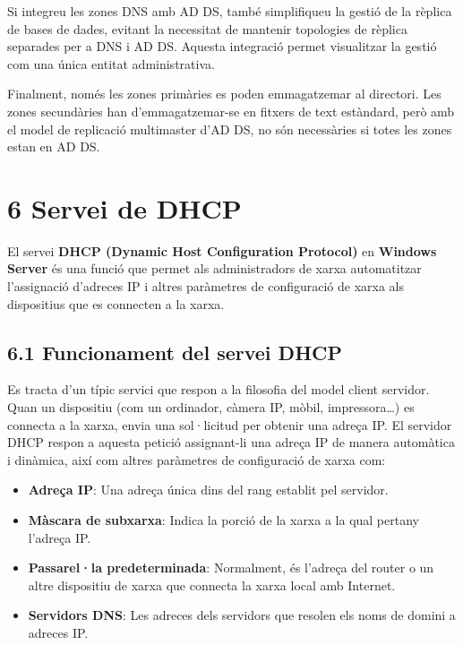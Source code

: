 \documentclass[
  a4paper,
]{article}
\providecommand{\tightlist}{%
  \setlength{\itemsep}{0pt}\setlength{\parskip}{0pt}}
\begin{document}
Si integreu les zones DNS amb AD DS, també simplifiqueu la gestió de la
rèplica de bases de dades, evitant la necessitat de mantenir topologies
de rèplica separades per a DNS i AD DS. Aquesta integració permet
visualitzar la gestió com una única entitat administrativa.

Finalment, només les zones primàries es poden emmagatzemar al directori.
Les zones secundàries han d'emmagatzemar-se en fitxers de text
estàndard, però amb el model de replicació multimaster d'AD DS, no són
necessàries si totes les zones estan en AD DS.

\section{6 Servei de DHCP}\label{servei-de-dhcp}

El servei \textbf{DHCP (Dynamic Host Configuration Protocol)} en
\textbf{Windows Server} és una funció que permet als administradors de
xarxa automatitzar l'assignació d'adreces IP i altres paràmetres de
configuració de xarxa als dispositius que es connecten a la xarxa.

\subsection{6.1 Funcionament del servei
DHCP}\label{funcionament-del-servei-dhcp}

Es tracta d'un típic servici que respon a la filosofia del model client
servidor. Quan un dispositiu (com un ordinador, càmera IP, mòbil,
impressora\ldots) es connecta a la xarxa, envia una sol·licitud per
obtenir una adreça IP. El servidor DHCP respon a aquesta petició
assignant-li una adreça IP de manera automàtica i dinàmica, així com
altres paràmetres de configuració de xarxa com:

\begin{itemize}
\tightlist
\item
  \textbf{Adreça IP}: Una adreça única dins del rang establit pel
  servidor.
\item
  \textbf{Màscara de subxarxa}: Indica la porció de la xarxa a la qual
  pertany l'adreça IP.
\item
  \textbf{Passarel·la predeterminada}: Normalment, és l'adreça del
  router o un altre dispositiu de xarxa que connecta la xarxa local amb
  Internet.
\item
  \textbf{Servidors DNS}: Les adreces dels servidors que resolen els
  noms de domini a adreces IP.
\end{itemize}
\end{document}
